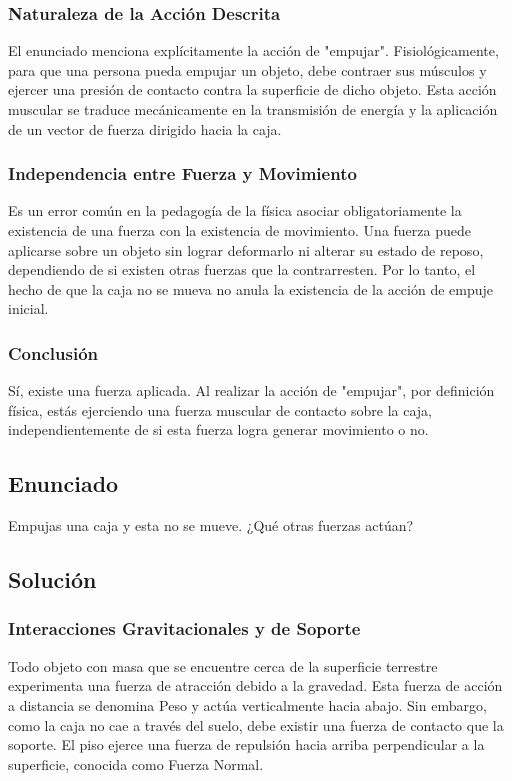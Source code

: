\documentclass[12pt]{article}
\begin{document}
\subsubsection*{Naturaleza de la Acción Descrita}
El enunciado menciona explícitamente la acción de "empujar". Fisiológicamente, para que una persona pueda empujar un objeto, debe contraer sus músculos y ejercer una presión de contacto contra la superficie de dicho objeto. Esta acción muscular se traduce mecánicamente en la transmisión de energía y la aplicación de un vector de fuerza dirigido hacia la caja.

\subsubsection*{Independencia entre Fuerza y Movimiento}
Es un error común en la pedagogía de la física asociar obligatoriamente la existencia de una fuerza con la existencia de movimiento. Una fuerza puede aplicarse sobre un objeto sin lograr deformarlo ni alterar su estado de reposo, dependiendo de si existen otras fuerzas que la contrarresten. Por lo tanto, el hecho de que la caja no se mueva no anula la existencia de la acción de empuje inicial.

\subsubsection*{Conclusión}
Sí, existe una fuerza aplicada. Al realizar la acción de "empujar", por definición física, estás ejerciendo una fuerza muscular de contacto sobre la caja, independientemente de si esta fuerza logra generar movimiento o no.

\newpage

\subsection*{Enunciado}
Empujas una caja y esta no se mueve. ¿Qué otras fuerzas actúan?

\subsection*{Solución}

\subsubsection*{Interacciones Gravitacionales y de Soporte}
Todo objeto con masa que se encuentre cerca de la superficie terrestre experimenta una fuerza de atracción debido a la gravedad. Esta fuerza de acción a distancia se denomina Peso y actúa verticalmente hacia abajo. Sin embargo, como la caja no cae a través del suelo, debe existir una fuerza de contacto que la soporte. El piso ejerce una fuerza de repulsión hacia arriba perpendicular a la superficie, conocida como Fuerza Normal.
\end{document}
